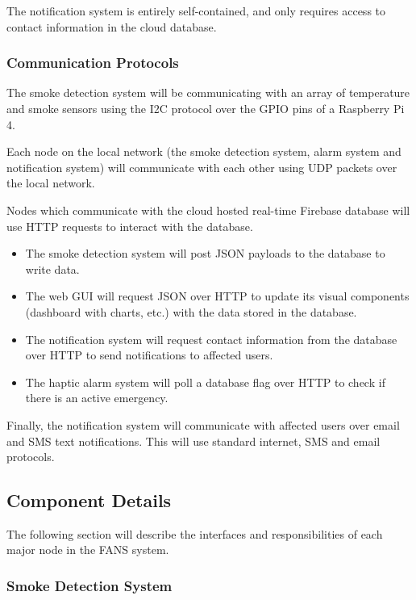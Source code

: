 The notification system is entirely self-contained, and only requires access to contact information in the cloud
database.

\subsubsection{Communication Protocols}

The smoke detection system will be communicating with an array of temperature and smoke sensors using the I2C protocol
over the GPIO pins of a Raspberry Pi 4.

Each node on the local network (the smoke detection system, alarm system and notification system) will communicate with
each other using UDP packets over the local network.

Nodes which communicate with the cloud hosted real-time Firebase database will use HTTP requests to interact with the
database.

\begin{itemize}
    \item The smoke detection system will post JSON payloads to the database to write data.
    \item The web GUI will request JSON over HTTP to update its visual components (dashboard with charts, etc.) with the data
          stored in the database.
    \item The notification system will request contact information from the database over HTTP to send notifications to affected
          users.
    \item The haptic alarm system will poll a database flag over HTTP to check if there is an active emergency.
\end{itemize}

Finally, the notification system will communicate with affected users over email and SMS text notifications. This will
use standard internet, SMS and email protocols.

\subsection{Component Details}

The following section will describe the interfaces and responsibilities of each major node in the FANS system.

\subsubsection{Smoke Detection System}

